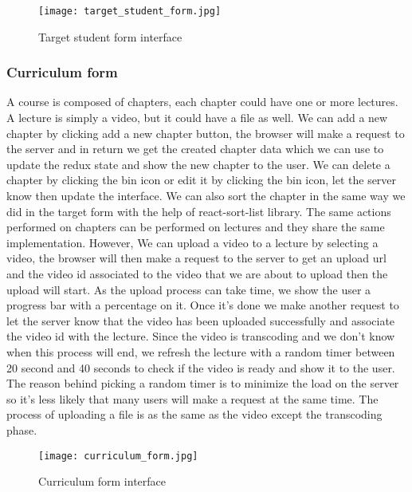 \vfill
\clearpage

\begin{figure}[!ht]
    \centering
    \texttt{[image: target\_student\_form.jpg]}
    \caption{Target student form interface}
    \label{fig:target_student_form}
\end{figure}


\subsubsection{Curriculum form}
A course is composed of chapters, each chapter could have one or more lectures. A lecture is simply a video, but it could have a file as well.
\hfill \break
\hfill \break
We can add a new chapter by clicking add a new chapter button, the browser will make a request to the server and in return we get the created chapter data which we can use to update the redux state and show the new chapter to the user. We can delete a chapter by clicking the bin icon or edit it by clicking the bin icon, let the server know then update the interface. We can also sort the chapter in the same way we did in the target form with the help of react-sort-list library.
\hfill \break
\hfill \break
The same actions performed on chapters can be performed on lectures and they share the same implementation. However, We can upload a video to a lecture by selecting a video, the browser will then make a request to the server to get an upload url and the video id associated to the video that we are about to upload then the upload will start. As the upload process can take time, we show the user a progress bar with a percentage on it. Once it's done we make another request to let the server know that the video has been uploaded successfully and associate the video id with the lecture. Since the video is transcoding and we don't know when this process will end, we refresh the lecture with a random timer between 20 second and 40 seconds to check if the video is ready and show it to the user. The reason behind picking a random timer is to minimize the load on the server so it's less likely that many users will make a request at the same time. The process of uploading a file is as the same as the video except the transcoding phase.

\begin{figure}[!ht]
    \centering
    \texttt{[image: curriculum\_form.jpg]}
    \caption{Curriculum form interface}
    \label{fig:curriculum_form}
\end{figure}


